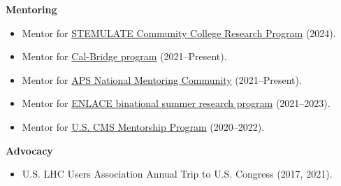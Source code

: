 \documentclass[11pt]{res}
\begin{document}
\begin{resume}
  \textbf{Mentoring}
  \begin{itemize}
    \itemsep-0.3em
    \item Mentor for \href{https://ucsdcreate.wordpress.com/2023/02/22/stemulate-community-college-summer-research-program-ucsd-summer-2022/}{STEMULATE Community College Research Program} ({2024}).
    \item Mentor for \href{https://www.cpp.edu/calbridge/index.shtml}{Cal-Bridge program} ({2021--Present}).
    \item Mentor for \href{https://aps.org/programs/minorities/nmc/}{APS National Mentoring Community} (2021--Present).
    \item Mentor for \href{http://resilientmaterials.ucsd.edu/ENLACE}{ENLACE binational summer research program} ({2021--2023}).
    \item Mentor for \href{https://uscms-diversity-equity-inclusion.github.io/mentorship.html}{U.S. CMS Mentorship Program} ({2020--2022}).
  \end{itemize}

  \textbf{Advocacy}
  \begin{itemize}
    \itemsep-0.3em
    \item U.S. LHC Users Association Annual Trip to U.S. Congress ({2017, 2021}).
  \end{itemize}


\end{resume}
\end{document}
